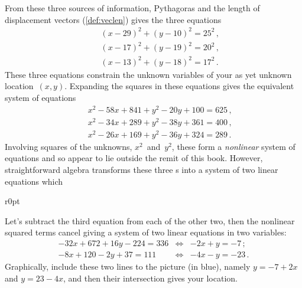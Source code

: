 \begin{example}
\begin{solution} 
From these three sources of information, Pythagoras and the length of displacement vectors (\cref{def:veclen}) gives the three equations
\begin{eqnarray*}
&&(x-29)^2+(y-10)^2=25^2\,,
\\&&(x-17)^2+(y-19)^2=20^2\,,
\\&&(x-13)^2+(y-18)^2=17^2\,.
\end{eqnarray*}
These three equations constrain the unknown variables of your as yet unknown location~\((x,y)\).
Expanding the squares in these equations gives the equivalent system of equations
\begin{eqnarray*}
&&x^2-58x+841+y^2-20y+100=625\,,
\\&&x^2-34x+289+y^2-38y+361=400\,,
\\&&x^2-26x+169+y^2-36y+324=289\,.
\end{eqnarray*}
Involving squares of the unknowns, \(x^2\)~and~\(y^2\), these form a \emph{nonlinear} system of equations and so appear to lie outside the remit of this book.  
However, straightforward algebra transforms these three s into a system of two linear equations which 

\begin{wrapfigure}r{0pt}
\end{wrapfigure}
Let's subtract the third equation from each of the other two, then the nonlinear squared terms cancel giving a system of two linear equations in two variables:
\begin{eqnarray*}
-32x+672+16y-224=336&\iff&-2x+y=-7\,;
\\-8x+120-2y+37=111&\iff&-4x-y=-23\,.
\end{eqnarray*}%
Graphically, include these two lines to the picture (in blue), namely \(y=-7+2x\) and \(y=23-4x\), and then their intersection gives your location.


\end{solution}
\end{example}
